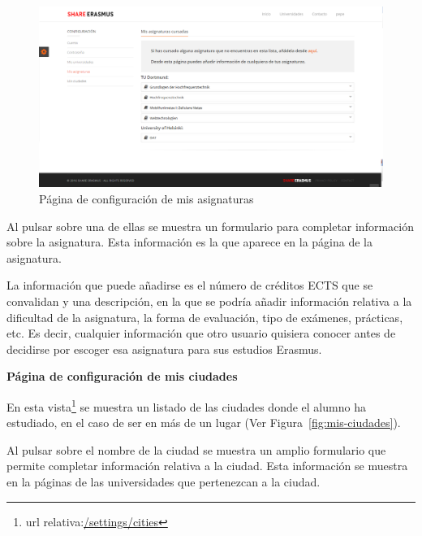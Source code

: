 \documentclass[a4paper, 12pt]{book}
\begin{document}
\begin{figure}[H]
  \centering
  \includegraphics[width=16cm, keepaspectratio]{img/mis-asignaturas.png}
  \caption{Página de configuración de mis asignaturas}
  \label{fig:mis-asignaturas}
\end{figure}

Al pulsar sobre una de ellas se muestra un formulario para completar información sobre la asignatura. Esta información es la que aparece en la página de la asignatura.
\newline

 La información que puede añadirse es el número de créditos ECTS que se convalidan y una descripción, en la que se podría añadir información relativa a la dificultad de la asignatura, la forma de evaluación, tipo de exámenes, prácticas, etc. Es decir, cualquier información que otro usuario quisiera conocer antes de decidirse por escoger esa asignatura para sus estudios Erasmus.
\newline

{\large  \textbf{Página de configuración de mis ciudades}\par}

En esta vista\footnote{url relativa:\url{/settings/cities}} se muestra un listado de las ciudades donde el alumno ha estudiado, en el caso de ser en más de un lugar (Ver Figura~\ref{fig:mis-ciudades}). 
\newline

Al pulsar sobre el nombre de la ciudad se muestra un amplio formulario que permite completar información relativa a la ciudad. Esta información se muestra en la páginas de las universidades que pertenezcan a la ciudad.
\newline
\end{document}
